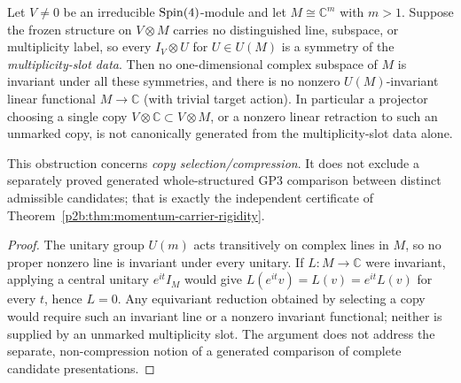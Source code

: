 \documentclass[12pt,a4paper]{article}
\begin{document}
\begin{proposition}
\label{p2b:prop:v279-no-canonical-copy-selector}
Let \(V\ne0\) be an irreducible \(\mathrm{Spin}(4)\)-module and let
\(M\cong\mathbb C^m\) with \(m>1\). Suppose the frozen structure on
\(V\otimes M\) carries no distinguished line, subspace, or multiplicity
label, so every \(I_V\otimes U\) for \(U\in U(M)\) is a symmetry of the
\emph{multiplicity-slot data}.  Then no one-dimensional complex subspace
of \(M\) is invariant under all these symmetries, and there is no
nonzero \(U(M)\)-invariant linear functional \(M\to\mathbb C\) (with
trivial target action).  In particular a projector choosing a single
copy \(V\otimes\mathbb C\subset V\otimes M\), or a nonzero linear
retraction to such an unmarked copy, is not canonically generated
from the multiplicity-slot data alone.

This obstruction concerns \emph{copy selection/compression}. It does not
exclude a separately proved generated whole-structured GP3 comparison
between distinct admissible candidates; that is exactly the independent
certificate of Theorem~\ref{p2b:thm:momentum-carrier-rigidity}.
\end{proposition}
\begin{proof}
The unitary group \(U(m)\) acts transitively on complex lines in
\(M\), so no proper nonzero line is invariant under every unitary.
If \(L:M\to\mathbb C\) were invariant, applying a central unitary
\(e^{it}I_M\) would give
\(L(e^{it}v)=L(v)=e^{it}L(v)\) for every \(t\), hence \(L=0\).
Any equivariant reduction obtained by selecting a copy would require
such an invariant line or a nonzero invariant functional; neither
is supplied by an unmarked multiplicity slot.  The argument does not
address the separate, non-compression notion of a generated comparison
of complete candidate presentations.
\end{proof}
\end{document}
